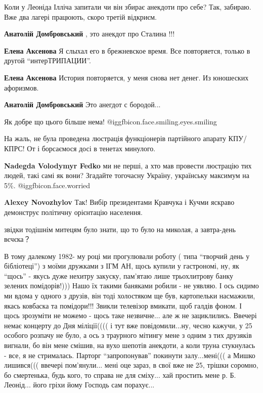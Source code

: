 \begin{itemize}

Коли у Леоніда Ілліча запитали чи він збирає анекдоти про себе? Так, забираю.
Вже два лагері працюють, скоро третій відкриєм.

\begin{itemize} %
\textbf{Анатолій Домбровський} , это анекдот про Сталина !!!

\textbf{Елена Аксенова} Я слыхал его в брежневское время. Все повторяется, только в другой \enquote{интерТРИПАЦИИ}.

\textbf{Елена Аксенова} История повторяется, у меня снова нет денег. Из юношеских афоризмов.

\textbf{Анатолій Домбровський} Это анегдот с бородой...
\end{itemize} %

Як добре що цього більше нема!  @igg{fbicon.face.smiling.eyes.smiling} 

\begin{itemize} %

На жаль, не була проведена люстрація функціонерів партійного апарату КПУ/КПРС! От і борсаємося досі в тенетах минулого.

\textbf{Nadegda Volodymyr Fedko} ми не перші, а хто мав провести люстрацію тих людей, такі самі як вони? Згадайте тогочасну Україну, українську максимум на 5\%. @igg{fbicon.face.worried} 

\textbf{Alexey Novozhylov} Так! Вибір президентами Кравчука і Кучми яскраво демонструє політичну орієнтацію населення.
\end{itemize} %

звідки тодішнім митецям було знати, що то було на миколая, а завтра-день вєчєка？


В тому далекому 1982- му році ми прогулювали роботу ( типа \enquote{творчий день у
бібліотеці}) з моїми дружками з ІГМ АН, щось купили у гастрономі, ну, як
\enquote{щось} - якусь дуже нехитру закуску, пам'ятаю лише трьохлитрову банку зелених
помідорів!))) Нашо їх такими баняками робили - не уявляю. І ось сидимо ми вдома
у одного з друзів, він тоді холостяком ще був, картопельки насмажили, якась
ковбаска та помідори!!! Звикли телевізор вмикати, щоб галдів фоном. І щось
зрозуміти не можемо - щось таке незвичне... але ж не зациклились. Ввечері немає
концерту до Дня міліції(((( і тут вже повідомили...ну, чесно кажучи, у 25
особого розпачу не було, а ось з траурного мітингу мене з одним з тих друзяків
вигнали, бо він мене смішив, на вухо шепотів анекдоти, а коли труна стукнулась
- все, я не стрималась. Парторг \enquote{запропонував} покинути залу...мені((( а Мишко
лишився((( ввечері пом'янули... мені оце зараз, в свої вже не 25, трішки
соромно, бо смертенька, будь кого, то справа не для сміху... хай простить мене
р. Б. Леонід... його гріхи йому Господь сам порахує...


\end{itemize}
